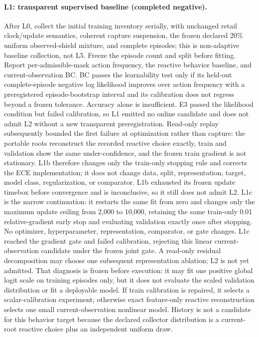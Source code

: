 \documentclass[11pt]{article}
\begin{document}
\paragraph{L1: transparent supervised baseline (completed negative).}
After L0, collect the initial training inventory serially, with unchanged retail
clock/update semantics, coherent capture suspension, the frozen declared 20\%
uniform observed-shield mixture, and complete episodes;
this is non-adaptive baseline collection, not L5.  Freeze the episode count and
split before fitting.  Report per-admissible-mask action frequency, the reactive
behavior baseline, and current-observation BC.  BC passes the learnability test
only if its held-out complete-episode negative log likelihood improves over
action frequency with a preregistered episode-bootstrap interval and its
calibration does not regress beyond a frozen tolerance.  Accuracy alone is
insufficient.  E3 passed the likelihood condition but failed calibration, so
L1 emitted no online candidate and does not admit L2 without a new transparent
preregistration.
Read-only replay subsequently bounded the first failure at optimization rather
than capture: the portable roots reconstruct the recorded reactive choice
exactly, train and validation show the same under-confidence, and the frozen
train gradient is not stationary.  L1b therefore changes only the train-only
stopping rule and corrects the ECE implementation; it does not change data,
split, representation, target, model class, regularization, or comparator.
L1b exhausted its frozen update timebox before convergence and is inconclusive,
so it still does not admit L2.  L1c is the narrow continuation: it restarts the
same fit from zero and changes only the maximum update ceiling from 2,000 to
10,000, retaining the same train-only 0.01 relative-gradient early stop and
evaluating validation exactly once after stopping.  No optimizer,
hyperparameter, representation, comparator, or gate changes.  L1c reached the
gradient gate and failed calibration, rejecting this linear current-observation
candidate under the frozen joint gate.  A read-only residual decomposition may
choose one subsequent representation ablation; L2 is not yet admitted.  That
diagnosis is frozen before execution: it may fit one positive global logit scale
on training episodes only, but it does not evaluate the scaled validation
distribution or fit a deployable model.  If train calibration is repaired, it
selects a scalar-calibration experiment; otherwise exact feature-only reactive
reconstruction selects one small current-observation nonlinear model.  History
is not a candidate for this behavior target because the declared collector
distribution is a current-root reactive choice plus an independent uniform
draw.
\end{document}
